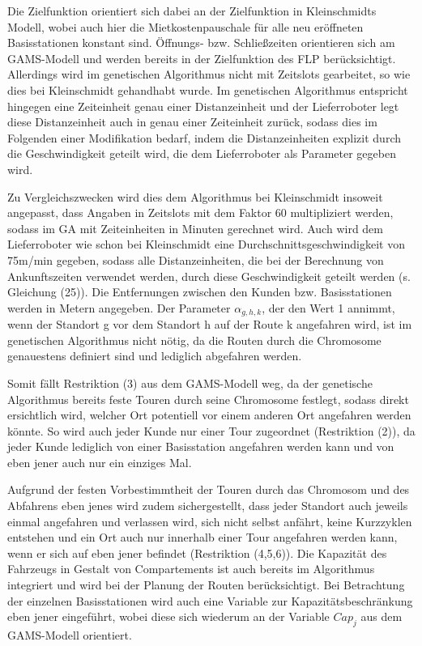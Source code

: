 \documentclass[a4paper,12pt,parskip,bibtotoc,liststotoc]{article}
\begin{document}
Die Zielfunktion orientiert sich dabei an der Zielfunktion in Kleinschmidts Modell, wobei auch hier die Mietkostenpauschale für alle neu eröffneten Basisstationen konstant sind. 
Öffnungs- bzw. Schließzeiten orientieren sich am GAMS-Modell und werden bereits in der Zielfunktion des FLP berücksichtigt.
Allerdings wird im genetischen Algorithmus nicht mit Zeitslots gearbeitet, so wie dies bei Kleinschmidt gehandhabt wurde.
Im genetischen Algorithmus entspricht hingegen eine Zeiteinheit genau einer Distanzeinheit und der Lieferroboter legt diese Distanzeinheit auch in genau einer Zeiteinheit zurück, sodass dies im Folgenden einer Modifikation bedarf, indem die Distanzeinheiten explizit durch die Geschwindigkeit geteilt wird, die dem Lieferroboter als Parameter gegeben wird.

Zu Vergleichszwecken wird dies dem Algorithmus bei Kleinschmidt insoweit angepasst, dass Angaben in Zeitslots mit dem Faktor 60 multipliziert werden, sodass im GA mit Zeiteinheiten in Minuten gerechnet wird. 
Auch wird dem Lieferroboter wie schon bei Kleinschmidt eine Durchschnittsgeschwindigkeit von 75m/min gegeben, sodass alle Distanzeinheiten, die bei der Berechnung von Ankunftszeiten verwendet werden, durch diese Geschwindigkeit geteilt werden (s. Gleichung (25)).
Die Entfernungen zwischen den Kunden bzw. Basisstationen werden in Metern angegeben.
Der Parameter $\alpha_{g,h,k}$, der den Wert 1 annimmt, wenn der Standort g vor dem Standort h auf der Route k angefahren wird, ist im genetischen Algorithmus nicht nötig, da die Routen durch die Chromosome genauestens definiert sind und lediglich abgefahren werden.

Somit fällt Restriktion (3) aus dem GAMS-Modell weg,  da der genetische Algorithmus bereits feste Touren durch seine Chromosome festlegt, sodass direkt ersichtlich wird, welcher Ort potentiell vor einem anderen Ort angefahren werden könnte.
So wird auch jeder Kunde nur einer Tour zugeordnet (Restriktion (2)), da jeder Kunde lediglich von einer Basisstation angefahren werden kann und von eben jener auch nur ein einziges Mal.

Aufgrund der festen Vorbestimmtheit der Touren durch das Chromosom und des Abfahrens eben jenes wird zudem sichergestellt, dass jeder Standort auch jeweils einmal angefahren und verlassen wird, sich nicht selbst anfährt, keine Kurzzyklen entstehen und ein Ort auch nur innerhalb einer Tour angefahren werden kann, wenn er sich auf eben jener befindet (Restriktion (4,5,6)).
Die Kapazität des Fahrzeugs in Gestalt von Compartements ist auch bereits im Algorithmus integriert und wird bei der Planung der Routen berücksichtigt.
Bei Betrachtung der einzelnen Basisstationen wird auch eine Variable zur Kapazitätsbeschränkung eben jener eingeführt, wobei diese sich wiederum an der Variable $Cap_{j}$ aus dem GAMS-Modell orientiert.
\end{document}

